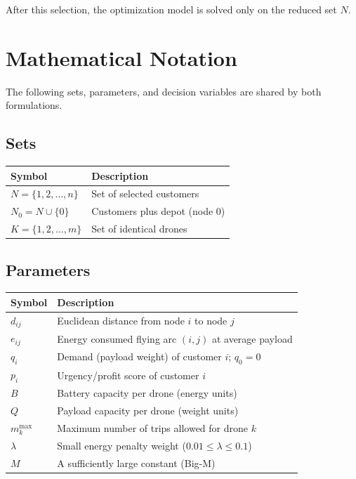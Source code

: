 \documentclass[12pt,a4paper]{article}
\begin{document}
After this selection, the optimization model is solved only on the reduced set $N$.

\section{Mathematical Notation}

The following sets, parameters, and decision variables are shared by both formulations.

\subsection{Sets}

\begin{center}
\begin{tabular}{ll}
\toprule
Symbol & Description \\
\midrule
$N = \{1, 2, \ldots, n\}$ & Set of selected customers \\
$N_0 = N \cup \{0\}$ & Customers plus depot (node 0) \\
$K = \{1, 2, \ldots, m\}$ & Set of identical drones \\
\bottomrule
\end{tabular}
\end{center}

\subsection{Parameters}

\begin{center}
\begin{tabular}{ll}
\toprule
Symbol & Description \\
\midrule
$d_{ij}$ & Euclidean distance from node $i$ to node $j$ \\
$e_{ij}$ & Energy consumed flying arc $(i,j)$ at average payload \\
$q_i$ & Demand (payload weight) of customer $i$; $q_0 = 0$ \\
$p_i$ & Urgency/profit score of customer $i$ \\
$B$ & Battery capacity per drone (energy units) \\
$Q$ & Payload capacity per drone (weight units) \\
$m^{\max}_k$ & Maximum number of trips allowed for drone $k$ \\
$\lambda$ & Small energy penalty weight ($0.01 \leq \lambda \leq 0.1$) \\
$M$ & A sufficiently large constant (Big-M) \\
\bottomrule
\end{tabular}
\end{center}
\end{document}
